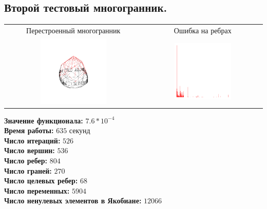 \documentclass[14pt,fleqn,a4paper]{scrartcl}
\begin{document}
\subsection{Второй тестовый многогранник.}
\begin{center}
\begin{tabular}{|c|c|}
\hline
Перестроенный многогранник & Ошибка на ребрах\\
\includegraphics[width=0.5\textwidth]{bigout2.png} &
\includegraphics[width=0.5\textwidth]{bigerror2.png} \\ 
\hline
\end{tabular}
\end{center}
\textbf{Значение функционала:} $7.6*10^{-4}$\\
\textbf{Время работы:} $635$ секунд\\
\textbf{Число итераций:} $526$\\
\textbf{Число вершин:} $536$\\
\textbf{Число ребер:} $804$\\
\textbf{Число граней:} $270$\\
\textbf{Число целевых ребер:} $68$ \\
\textbf{Число переменных:} $5904$\\
\textbf{Число ненулевых элементов в Якобиане:} $12066$\\
\end{document}

